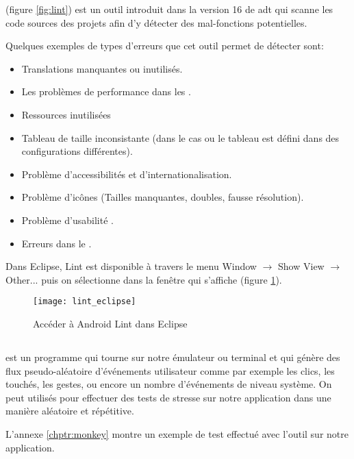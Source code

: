 \android{}  (figure \ref{fig:lint}) est un outil introduit dans la version 16 de \gls{adt} qui scanne les code sources des projets \android{} afin d'y détecter des mal-fonctions potentielles.

Quelques exemples de types d'erreurs que cet outil permet de détecter sont:

\begin{itemize}

\item Translations manquantes ou inutilisés.

\item Les problèmes de performance dans les .

\item Ressources inutilisées

\item Tableau de taille inconsistante (dans le cas ou le tableau est défini dans des configurations différentes).

\item Problème d'accessibilités et d'internationalisation.

\item Problème d'icônes (Tailles manquantes, doubles, fausse résolution).

\item Problème d'usabilité .

\item Erreurs dans le .

\end{itemize}

Dans Eclipse, \android{} Lint est disponible à travers le menu Window $\rightarrow$ Show View $\rightarrow$ Other... puis on sélectionne  dans la fenêtre qui s'affiche (figure \ref{fig:lint_eclipse}).

\begin{figure}
\center
\texttt{[image: lint\_eclipse]}
\caption{Accéder à Android Lint dans Eclipse}
\label{fig:lint_eclipse}
\end{figure}

\subsection[UI/Application Exerciser Monkey]{}

 \cite{tools:monkey} est un programme qui tourne sur notre émulateur ou terminal \android{} et qui génère des flux pseudo-aléatoire d’événements utilisateur comme par exemple les clics, les touchés, les gestes, ou encore un nombre d’événements de niveau système. On peut utilisés  pour effectuer des tests de stresse sur notre application dans une manière aléatoire et répétitive.

L'annexe \ref{chptr:monkey} montre un exemple de test effectué avec l'outil  sur notre application.